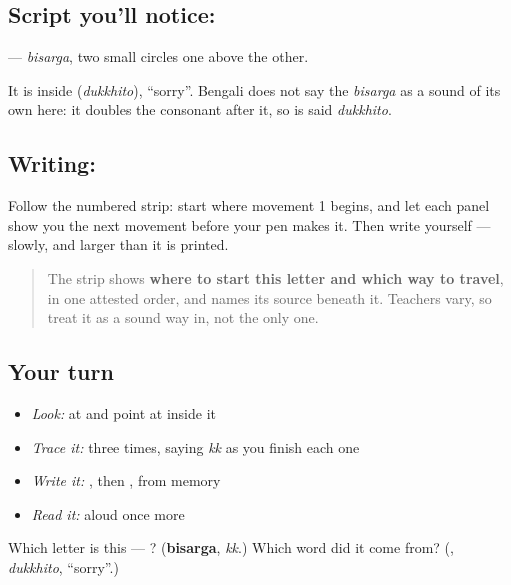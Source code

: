 \subsection*{Script you'll notice: }
\textbf{} — \emph{bisarga}, two small circles one above the other.

It is inside \textbf{} (\emph{dukkhito}), \textquotedblleft{}sorry\textquotedblright{}. Bengali does not say the \emph{bisarga} as a sound of its own here: it doubles the consonant after it, so \textbf{} is said \emph{dukkhito}.

\subsection*{Writing: }

Follow the numbered strip: start where movement 1 begins, and let each panel show you the next movement before your pen makes it. Then write  yourself — slowly, and larger than it is printed.

\begin{quote}
The strip shows \textbf{where to start this letter and which way to travel}, in one attested order, and names its source beneath it. Teachers vary, so treat it as a sound way in, not the only one.
\end{quote}

\subsection*{Your turn}
\begin{itemize}
\raggedright
  \item \emph{Look:} at \textbf{} and point at  inside it
  \item \emph{Trace it:}  three times, saying \emph{kk} as you finish each one
  \item \emph{Write it:} , then , from memory
  \item \emph{Read it:} \textbf{} aloud once more
\end{itemize}

\begin{tcolorbox}[breakable,colback=teal!4,colframe=teal!35!black,title={Before you move on}]
Which letter is this — ? (\textbf{bisarga}, \emph{kk}.) Which word did it come from? (\textbf{}, \emph{dukkhito}, \textquotedblleft{}sorry\textquotedblright{}.)
\end{tcolorbox}
